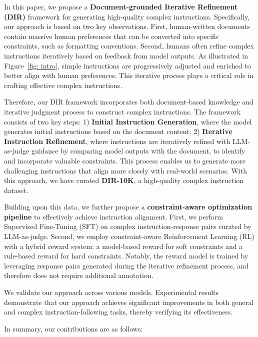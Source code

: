 In this paper, we propose a \textbf{Document-grounded Iterative Refinement (DIR)} framework for generating high-quality complex instructions.
Specifically, our approach is based on two key observations. First, human-written documents contain massive human preferences that can be converted into specific constraints, such as formatting conventions. Second, humans often refine complex instructions iteratively based on feedback from model outputs. As illustrated in Figure~\ref{fig: intro}, simple instructions are progressively adjusted and enriched to better align with human preferences. This iterative process plays a critical role in crafting effective complex instructions.

Therefore, our DIR framework incorporates both document-based knowledge and iterative judgment process to construct complex instructions. 
The framework consists of two key steps: 1) \textbf{Initial Instruction Generation}, where the model generates initial instructions based on the document content; 2) \textbf{Iterative Instruction Refinement}, where instructions are iteratively refined with LLM-as-judge guidance by comparing model outputs with the document, to identify and incorporate valuable constraints. This process enables us to generate more challenging instructions that align more closely with real-world scenarios. With this approach, we have curated \textbf{DIR-10K}, a high-quality complex instruction dataset.

Building upon this data, we further propose a \textbf{constraint-aware optimization pipeline} to effectively achieve instruction alignment. First, we perform Supervised Fine-Tuning (SFT) on complex instruction-response pairs curated by LLM-as-judge. Second, we employ constraint-aware Reinforcement Learning (RL) with a hybrid reward system: a model-based reward for soft constraints and a rule-based reward for hard constraints. Notably, the reward model is trained by leveraging response pairs generated during the iterative refinement process, and therefore does not require additional annotation. 

We validate our approach across various models. Experimental results demonstrate that our approach achieves significant improvements in both general and complex instruction-following tasks, thereby verifying its effectiveness. 

In summary, our contributions are as follows: 

